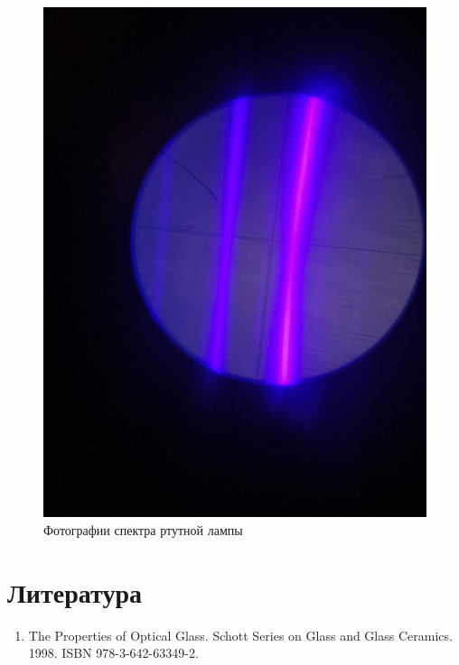 \documentclass[a4paper,12pt]{article}
\begin{document}
\begin{figure}[H]
    \centering
    \includegraphics[scale=0.2]{purple.png}
    \caption{Фотографии спектра ртутной лампы}
\end{figure}


\section*{Литература}
\begin{enumerate}
    \item The Properties of Optical Glass. Schott Series on Glass and Glass Ceramics. 1998. ISBN 978-3-642-63349-2.
\end{enumerate}
\end{document}
